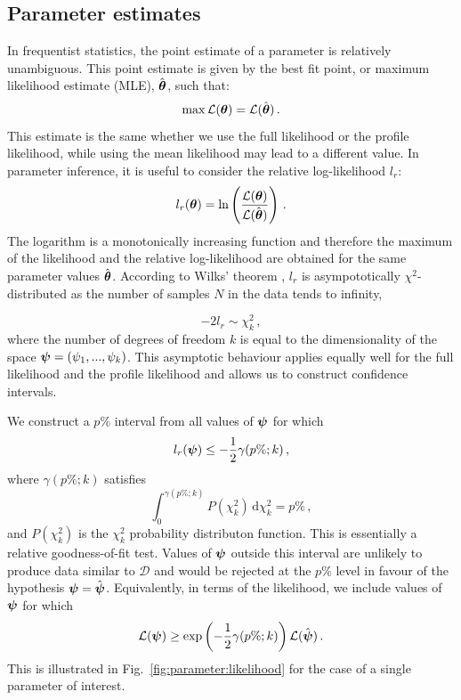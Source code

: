 \subsection{Parameter estimates}
\label{sec:ParamRecon:freqparams}
In frequentist statistics, the point estimate of a parameter is relatively unambiguous. This point estimate is given by the best fit point, or maximum likelihood estimate (MLE), $\hat{\boldsymbol\theta}$, such that:
\begin{equation}
\max \mathcal{L}(\boldsymbol\theta) = \mathcal{L}(\hat{\boldsymbol\theta})\,.
\end{equation}
This estimate is the same whether we use the full likelihood or the profile likelihood, while using the mean likelihood may lead to a different value. In parameter inference, it is useful to consider the relative log-likelihood $l_r$:
\begin{equation}
l_r(\boldsymbol\theta) = \ln\left(\frac{\mathcal{L}(\boldsymbol\theta)}{\mathcal{L}(\hat{\boldsymbol\theta})}\right)\,.
\end{equation}
The logarithm is a monotonically increasing function and therefore the maximum of the likelihood and the relative log-likelihood are obtained for the same parameter values $\hat{\boldsymbol\theta}$. According to Wilks' theorem \cite{Wilks:1938}, $l_r$ is asympototically $\chi^2$-distributed as the number of samples $N$ in the data tends to infinity,

\begin{equation}
-2l_r \sim \chi^2_k\,,
\end{equation}
where the number of degrees of freedom $k$ is equal to the dimensionality of the space $\boldsymbol\psi = \left(\psi_1,...,\psi_k\right)$. This asymptotic behaviour applies equally well for the full likelihood and the profile likelihood \cite{Biller:2014} and allows us to construct confidence intervals. 

We construct a $p\%$ interval from all values of $\boldsymbol\psi$ for which 
\begin{equation}
l_r(\boldsymbol\psi) \leq -\frac{1}{2} \gamma(p\%;k)\,,
\end{equation}
where $\gamma(p\%;k)$ satisfies
\begin{equation}
\int_{0}^{\gamma(p\%;k)} P(\chi^2_k)\,\mathrm{d}\chi^2_k = p\%\,,
\end{equation}
and $P(\chi^2_k)$ is the $\chi^2_k$ probability distributon function. This is essentially a relative goodness-of-fit test. Values of $\boldsymbol\psi$ outside this interval are unlikely to produce data similar to $\mathcal{D}$ and would be rejected at the $p\%$ level in favour of the hypothesis $\boldsymbol\psi = \hat{\boldsymbol\psi}$. Equivalently, in terms of the likelihood, we include values of $\boldsymbol\psi$ for which
\begin{equation}
\mathcal{L}(\boldsymbol\psi) \geq \exp\left(-\frac{1}{2} \gamma(p\%;k)\right) \mathcal{L}(\hat{\boldsymbol\psi})\,.
\end{equation}
This is illustrated in Fig.~\ref{fig:parameter:likelihood} for the case of a single parameter of interest. 

